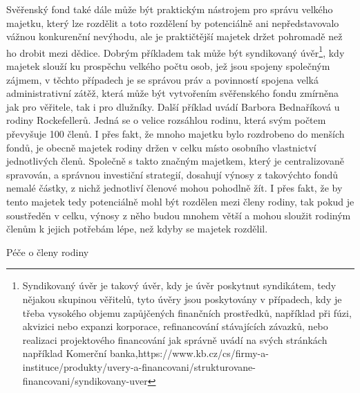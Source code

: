 \documentclass{article}
\begin{document}
 Svěřenský fond také dále může být praktickým nástrojem pro správu velkého majetku, který lze rozdělit a toto rozdělení by potenciálně ani nepředstavovalo vážnou konkurenční nevýhodu, ale je praktičtější majetek držet pohromadě než ho drobit mezi dědice. Dobrým příkladem tak může být syndikovaný úvěr\footnote{Syndikovaný úvěr je takový úvěr, kdy je úvěr poskytnut syndikátem, tedy nějakou skupinou věřitelů, tyto úvěry jsou poskytovány v případech, kdy je třeba vysokého objemu zapůjčených finančních prostředků, například při fúzi, akvizici nebo expanzi korporace, refinancování stávajících závazků, nebo realizaci projektového financování jak správně uvádí na svých stránkách například Komerční banka,https://www.kb.cz/cs/firmy-a-instituce/produkty/uvery-a-financovani/strukturovane-financovani/syndikovany-uver}, kdy majetek slouží ku prospěchu velkého počtu osob, jež jsou spojeny společným zájmem, v těchto případech je se správou práv a povinností spojena velká administrativní zátěž, která může být vytvořením svěřenského fondu zmírněna jak pro věřitele, tak i pro dlužníky. Další příklad uvádí Barbora Bednaříková u rodiny Rockefellerů. Jedná se o velice rozsáhlou rodinu, která svým počtem převyšuje 100 členů. I přes fakt, že mnoho majetku bylo rozdrobeno do menších fondů, je obecně majetek rodiny držen v celku místo osobního vlastnictví jednotlivých členů. Společně s takto značným majetkem, který je centralizovaně spravován, a správnou investiční strategií, dosahují výnosy z takovýchto fondů nemalé částky, z nichž jednotliví členové mohou pohodlně žít. I přes fakt, že by tento majetek tedy potenciálně mohl být rozdělen mezi členy rodiny, tak pokud je soustředěn v celku, výnosy z něho budou mnohem větší a mohou sloužit rodiným členům k jejich potřebám lépe, než kdyby se majetek rozdělil.
 
 
 \newpage
 \thispagestyle{smallertextinheader}
 
  \begin{enumerate}
 {\Large\item[5.] Péče o členy rodiny}
 \end{enumerate}
 
\end{document}
